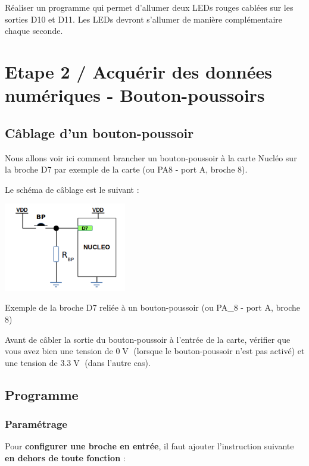 \documentclass[a4paper,11pt,titlepage]{article} %
\begin{document}
\Manip Réaliser un programme qui permet d'allumer deux LEDs rouges cablées sur les sorties D10 et D11. Les LEDs devront s'allumer de manière complémentaire chaque seconde.

\newpage
\section{Etape 2 / Acquérir des données numériques - Bouton-poussoirs}


\subsection{Câblage d'un bouton-poussoir}

Nous allons voir ici comment brancher un bouton-poussoir à la carte Nucléo sur la broche D7 par exemple de la carte (ou PA8 - port A, broche 8).

Le schéma de câblage est le suivant :

\begin{center}
	\includegraphics[width=0.4\textwidth]{images/MINE_Nucleo_BoutonPoussoir.png}
	
	Exemple de la broche D7 reliée à un bouton-poussoir (ou PA\_8 - port A, broche 8)
\end{center}

Avant de câbler la sortie du bouton-poussoir à l'entrée de la carte, vérifier que vous avez bien une tension de $0\operatorname{V}$ (lorsque le bouton-poussoir n'est pas activé) et une tension de $3.3\operatorname{V}$ (dans l'autre cas).

\subsection{Programme}

\subsubsection{Paramétrage}

Pour \textbf{configurer une broche en entrée}, il faut ajouter l'instruction suivante \textbf{en dehors de toute fonction} :
\end{document}
